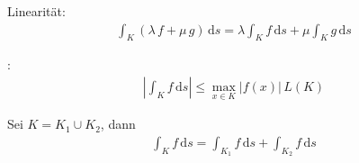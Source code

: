 \documentclass[a4paper,10pt]{scrbook}
\begin{document}

\begin{notice}
  \begin{enum-arab}
    \item Linearität:
    \begin{align*}
      \int_K (\lambda \, f + \mu \, g) \, \mathrm{d}s = \lambda \int_K f \, \mathrm{d}s + \mu \int_K g \, \mathrm{d}s
    \end{align*}

    \item {}:
    \begin{align*}
      \left| \int_K f \, \mathrm{d}s \right| \leq \max\limits_{x \in K} |f(x)| \, L(K)
    \end{align*}

    \item Sei $K = K_1 \cup K_2$, dann
    \begin{align*}
      \int_K f \, \mathrm{d}s = \int_{K_1} f \, \mathrm{d}s + \int_{K_2} f \, \mathrm{d}s
    \end{align*}
  \end{enum-arab}
\end{notice}
\end{document}
